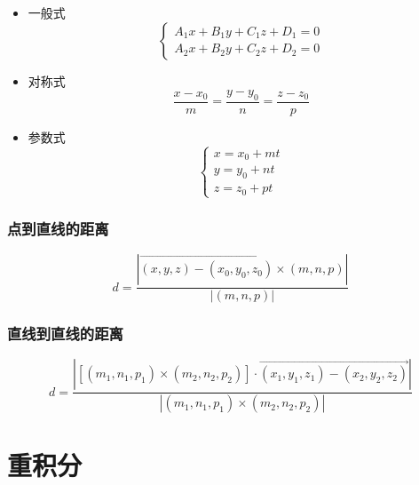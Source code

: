 \documentclass{ctexart}
\begin{document}
\begin{itemize}
    \item 一般式 \begin{equation}
              \begin{cases}
                  A_1 x + B_1 y + C_1 z + D_1 = 0 \\
                  A_2 x + B_2 y + C_2 z + D_2 = 0
              \end{cases}
          \end{equation}
    \item 对称式 \begin{equation}
              \frac{x - x_0}{m} = \frac{y - y_0}{n} = \frac{z - z_0}{p}
          \end{equation}
    \item 参数式 \begin{equation}
              \begin{cases}
                  x = x_0 + m t \\
                  y = y_0 + n t \\
                  z = z_0 + p t
              \end{cases}
          \end{equation}
\end{itemize}

\subsubsection{点到直线的距离}

\begin{equation}
    d = \frac{\left|\overrightarrow{(x, y, z) - (x_0, y_0, z_0)} \times (m, n, p)\right|}{|(m, n, p)|}
\end{equation}

\subsubsection{直线到直线的距离}

\begin{equation}
    d = \frac{\left|\left[(m_1, n_1, p_1) \times (m_2, n_2, p_2) \right] \cdot \overrightarrow{(x_1, y_1, z_1) - (x_2, y_2, z_2)}\right|}{\left|(m_1, n_1, p_1) \times (m_2, n_2, p_2)\right|}
\end{equation}

\section{重积分}
\end{document}
